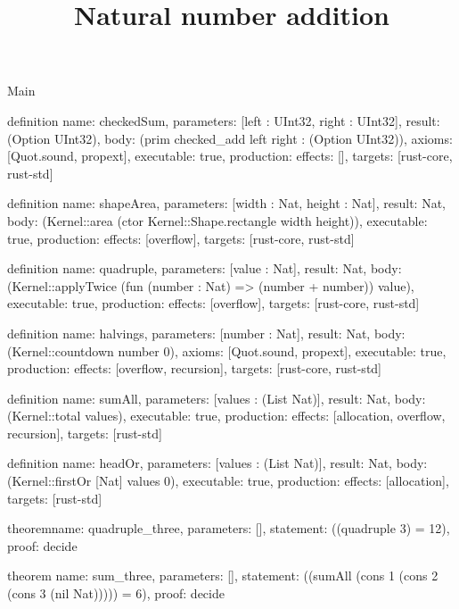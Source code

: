\begin{lexlean}{Main}
\title{Natural number addition}
\begin{semanticmodule}
definition{
  name: checkedSum,
  parameters: [left : UInt32, right : UInt32],
  result: (Option UInt32),
  body: (prim checked_add left right : (Option UInt32)),
  axioms: [Quot.sound, propext],
  executable: true,
  production: {effects: [], targets: [rust-core, rust-std]}
}

definition{
  name: shapeArea,
  parameters: [width : Nat, height : Nat],
  result: Nat,
  body: (Kernel::area (ctor Kernel::Shape.rectangle width height)),
  executable: true,
  production: {effects: [overflow], targets: [rust-core, rust-std]}
}

definition{
  name: quadruple,
  parameters: [value : Nat],
  result: Nat,
  body: (Kernel::applyTwice (fun (number : Nat) => (number + number)) value),
  executable: true,
  production: {effects: [overflow], targets: [rust-core, rust-std]}
}

definition{
  name: halvings,
  parameters: [number : Nat],
  result: Nat,
  body: (Kernel::countdown number 0),
  axioms: [Quot.sound, propext],
  executable: true,
  production: {effects: [overflow, recursion], targets: [rust-core, rust-std]}
}

definition{
  name: sumAll,
  parameters: [values : (List Nat)],
  result: Nat,
  body: (Kernel::total values),
  executable: true,
  production: {effects: [allocation, overflow, recursion], targets: [rust-std]}
}

definition{
  name: headOr,
  parameters: [values : (List Nat)],
  result: Nat,
  body: (Kernel::firstOr [Nat] values 0),
  executable: true,
  production: {effects: [allocation], targets: [rust-std]}
}

theorem{name: quadruple_three, parameters: [], statement: ((quadruple 3) = 12), proof: decide{}}

theorem{
  name: sum_three,
  parameters: [],
  statement: ((sumAll (cons 1 (cons 2 (cons 3 (nil Nat))))) = 6),
  proof: decide{}
}
\end{semanticmodule}
\end{lexlean}
